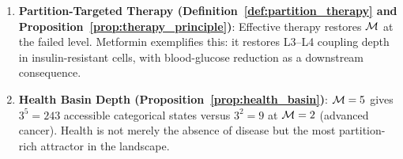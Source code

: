 \begin{chapterbox}[title=Chapter 22 --- Key Results Established]
\begin{enumerate}[label=\textbf{\arabic*.}]
  \item \textbf{Partition-Targeted Therapy (Definition~\ref{def:partition_therapy}
        and Proposition~\ref{prop:therapy_principle})}:
        Effective therapy restores $\mathcal{M}$ at the failed level.
        Metformin exemplifies this: it restores L3--L4 coupling depth in
        insulin-resistant cells, with blood-glucose reduction as a downstream
        consequence.

  \item \textbf{Health Basin Depth (Proposition~\ref{prop:health_basin})}:
        $\mathcal{M} = 5$ gives $3^5 = 243$ accessible categorical states versus
        $3^2 = 9$ at $\mathcal{M} = 2$ (advanced cancer). Health is not merely
        the absence of disease but the most partition-rich attractor in the
        landscape.
\end{enumerate}
\end{chapterbox}
